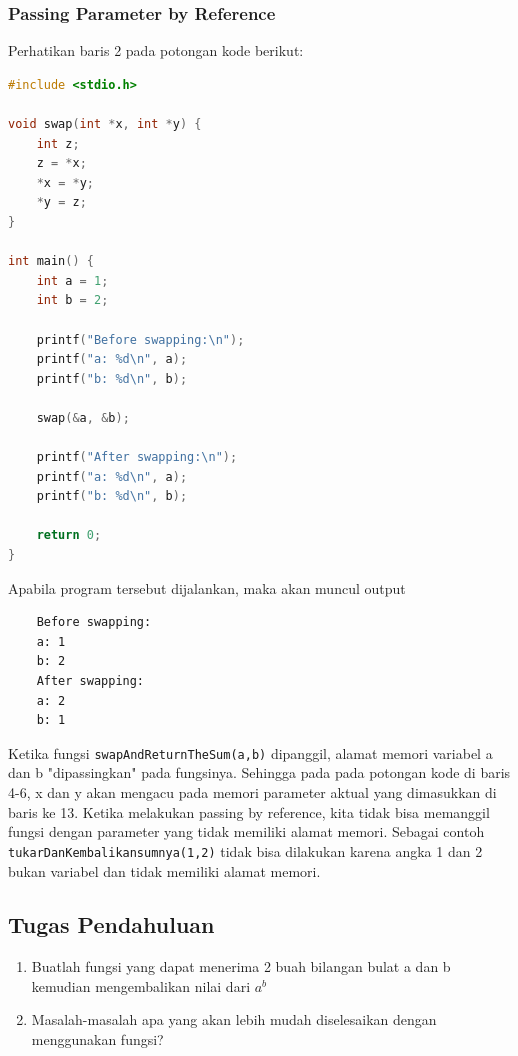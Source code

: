 \subsubsection{Passing Parameter by Reference}
Perhatikan baris 2 pada potongan kode berikut:
\begin{lstlisting}[language=c,caption = Passing by Reference,label=lst:passbyreference01]
#include <stdio.h>

void swap(int *x, int *y) {
    int z;
    z = *x;
    *x = *y;
    *y = z;
}

int main() {
    int a = 1;
    int b = 2;
    
    printf("Before swapping:\n");
    printf("a: %d\n", a);
    printf("b: %d\n", b);
    
    swap(&a, &b);
    
    printf("After swapping:\n");
    printf("a: %d\n", a);
    printf("b: %d\n", b);
    
    return 0;
}
\end{lstlisting}
Apabila program tersebut dijalankan, maka akan muncul output
\begin{verbatim}
    Before swapping:
    a: 1
    b: 2
    After swapping:
    a: 2
    b: 1
\end{verbatim}

Ketika fungsi \verb|swapAndReturnTheSum(a,b)| dipanggil, alamat memori variabel a dan b "dipassingkan" pada fungsinya. Sehingga pada pada potongan kode di baris 4-6, x dan y akan mengacu pada memori parameter aktual yang dimasukkan di baris ke 13. Ketika melakukan passing by reference, kita tidak bisa memanggil fungsi dengan parameter yang tidak memiliki alamat memori. Sebagai contoh \verb|tukarDanKembalikansumnya(1,2)| tidak bisa dilakukan karena angka 1 dan 2 bukan variabel dan tidak memiliki alamat memori.

\subsection{Tugas Pendahuluan}
\begin{enumerate}
   \item Buatlah fungsi yang dapat menerima 2 buah bilangan bulat a dan b kemudian mengembalikan nilai dari $a^b$
   \item Masalah-masalah apa yang akan lebih mudah diselesaikan dengan menggunakan fungsi?
\end{enumerate}

